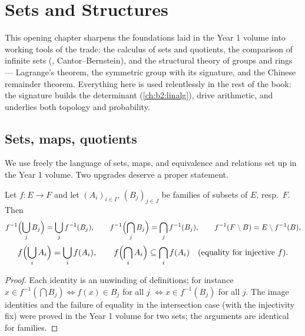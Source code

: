 \chapter{Sets and Structures}\label{ch:b2:structures}

This opening chapter sharpens the foundations laid in the Year 1
volume into working tools of the trade: the calculus of sets and
quotients, the comparison of infinite sets (,
Cantor--Bernstein), and the structural theory of groups and rings ---
Lagrange's theorem, the symmetric group with its signature,  and
the Chinese remainder theorem. Everything here is used relentlessly in
the rest of the book: the signature builds the determinant
(\cref{ch:b2:linalg}),  drive arithmetic, and
 underlies both topology and probability.

\section{Sets, maps, quotients}

We use freely the language of sets, maps, and equivalence and 
relations set up in the Year 1 volume. Two upgrades deserve a proper
statement.

\begin{proposition}\label{prop:b2:structures:images}
Let $f \colon E \to F$ and let $(A_i)_{i \in I}$, $(B_j)_{j \in J}$
be families of subsets of $E$, resp.\ $F$. Then
\[
f^{-1}\Bigl(\bigcup_j B_j\Bigr) = \bigcup_j f^{-1}(B_j),
\qquad
f^{-1}\Bigl(\bigcap_j B_j\Bigr) = \bigcap_j f^{-1}(B_j),
\qquad
f^{-1}(F \setminus B) = E \setminus f^{-1}(B),
\]
\[
f\Bigl(\bigcup_i A_i\Bigr) = \bigcup_i f(A_i),
\qquad
f\Bigl(\bigcap_i A_i\Bigr) \subseteq \bigcap_i f(A_i)
\quad (\text{equality for injective } f).
\]
\end{proposition}

\begin{proof}
Each identity is an unwinding of definitions; for instance $x \in
f^{-1}(\bigcap B_j) \iff f(x) \in B_j$ for all $j$ $\iff x \in
f^{-1}(B_j)$ for all $j$. The image identities and the failure of
equality in the intersection case (with the injectivity fix) were
proved in the Year 1 volume for two sets; the arguments are identical
for families.
\end{proof}

